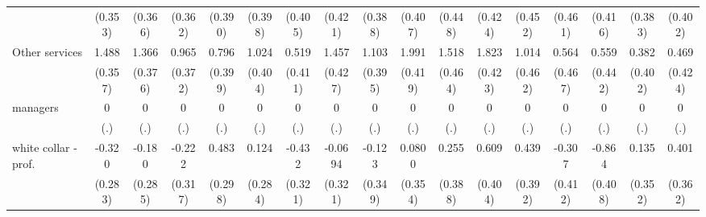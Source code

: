 {\begin{tabular}{l*{16}{c}}
                    &     (0.353)         &     (0.366)         &     (0.362)         &     (0.390)         &     (0.398)         &     (0.405)         &     (0.421)         &     (0.388)         &     (0.407)         &     (0.448)         &     (0.424)         &     (0.452)         &     (0.461)         &     (0.416)         &     (0.383)         &     (0.402)         \\
[1em]
Other services      &       1.488\sym{***}&       1.366\sym{***}&       0.965\sym{**} &       0.796\sym{*}  &       1.024\sym{*}  &       0.519         &       1.457\sym{***}&       1.103\sym{**} &       1.991\sym{***}&       1.518\sym{**} &       1.823\sym{***}&       1.014\sym{*}  &       0.564         &       0.559         &       0.382         &       0.469         \\
                    &     (0.357)         &     (0.376)         &     (0.372)         &     (0.399)         &     (0.404)         &     (0.411)         &     (0.427)         &     (0.395)         &     (0.419)         &     (0.464)         &     (0.423)         &     (0.462)         &     (0.467)         &     (0.442)         &     (0.402)         &     (0.424)         \\
[1em]
managers            &           0         &           0         &           0         &           0         &           0         &           0         &           0         &           0         &           0         &           0         &           0         &           0         &           0         &           0         &           0         &           0         \\
                    &         (.)         &         (.)         &         (.)         &         (.)         &         (.)         &         (.)         &         (.)         &         (.)         &         (.)         &         (.)         &         (.)         &         (.)         &         (.)         &         (.)         &         (.)         &         (.)         \\
[1em]
white collar - prof.&      -0.320         &      -0.180         &      -0.222         &       0.483         &       0.124         &      -0.432         &     -0.0694         &      -0.123         &      0.0800         &       0.255         &       0.609         &       0.439         &      -0.307         &      -0.864\sym{*}  &       0.135         &       0.401         \\
                    &     (0.283)         &     (0.285)         &     (0.317)         &     (0.298)         &     (0.284)         &     (0.321)         &     (0.321)         &     (0.349)         &     (0.354)         &     (0.388)         &     (0.404)         &     (0.392)         &     (0.412)         &     (0.408)         &     (0.352)         &     (0.362)         \\

\end{tabular}}
